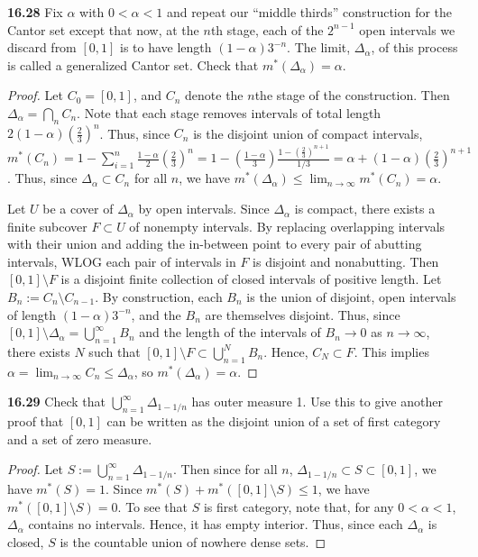 \documentclass{article}
\newcommand{\p}{\textbf}
\begin{document}
\p{16.28} Fix $\alpha$ with $0 < \alpha < 1$ and repeat our ``middle thirds'' construction for the Cantor set except that now, at the $n$th stage, each of the $2^{n-1}$ open intervals we discard from $[0,1]$ is to have length $(1-\alpha)3^{-n}$. The limit, $\Delta_\alpha$, of this process is called a generalized Cantor set. Check that $m^*(\Delta_\alpha) = \alpha$.
\begin{proof}
Let $C_0 = [0,1]$, and $C_n$ denote the $n$the stage of the construction. Then $\Delta_\alpha = \bigcap_n C_n$.  Note that each stage removes intervals of total length $2 (1-\alpha) (\frac 2 3)^n$.  Thus, since $C_n$ is the disjoint union of compact intervals, $m^*(C_n) = 1  - \sum_{i=1}^n \frac{1-\alpha} 2 (\frac 2 3)^n = 1 - (\frac {1-\alpha} 3) \frac{1 - (\frac 2 3)^{n+1}} {1/3} = \alpha + (1 - \alpha) (\frac 2 3)^{n+1}$. Thus, since $\Delta_\alpha \subset C_n$ for all $n$, we have $m^*(\Delta_\alpha) \leq \lim_{n \rightarrow \infty} m^*(C_n) = \alpha$.


Let $U$ be a cover of $\Delta_\alpha$ by open intervals. Since $\Delta_\alpha$ is compact, there exists a finite subcover $F \subset U$ of nonempty intervals. By replacing overlapping intervals with their union and adding the in-between point to every pair of abutting intervals, WLOG each pair of intervals in $F$ is disjoint and nonabutting. Then $[0,1] \setminus F$ is a disjoint finite collection of closed intervals of positive length. Let $B_n := C_n \setminus C_{n-1}$. By construction, each $B_n$ is the union of disjoint, open intervals of length $(1-\alpha)3^{-n}$, and the $B_n$ are themselves disjoint. Thus, since $[0,1] \setminus \Delta_\alpha = \bigcup_{n=1}^\infty{B_n}$ and the length of the intervals of $B_n \rightarrow 0$ as $n \rightarrow \infty$, there exists $N$ such that $[0,1] \setminus F \subset \bigcup_{n=1}^N{B_n}.$  Hence, $C_N \subset F$. This implies $\alpha = \lim_{n\rightarrow \infty}{C_n} \leq \Delta_\alpha$, so  $m^*(\Delta_\alpha) = \alpha$.
\end{proof}



\p{16.29} Check that $\bigcup_{n=1}^\infty \Delta_{1-1/n}$ has outer measure 1. Use this to give another proof that $[0,1]$ can be written as the disjoint union of a set of first category and a set of zero measure.
\begin{proof}
Let $S := \bigcup_{n=1}^\infty \Delta_{1-1/n}$. Then since for all $n$, $\Delta_{1-1/n} \subset S \subset [0,1]$, we have $m^*(S) = 1$. Since $m^*(S) + m^*([0,1]\setminus S) \leq 1$, we have $m^*([0,1]\setminus S) = 0$.  To see that $S$ is first category, note that, for any $0 < \alpha < 1$, $\Delta_\alpha$ contains no intervals. Hence, it has empty interior. Thus, since each $\Delta_\alpha$ is closed, $S$ is the countable union of nowhere dense sets.

\end{proof}
\end{document}
